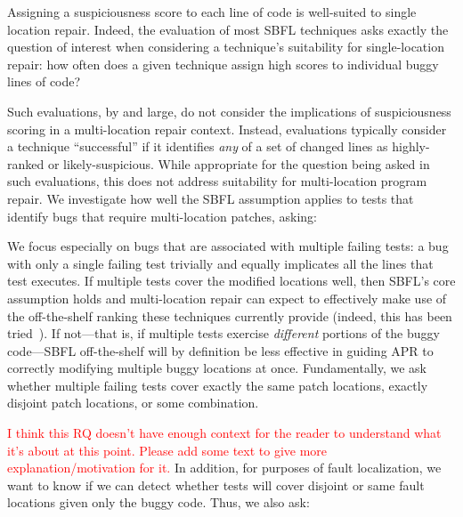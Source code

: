 \documentclass[10pt, conference]{IEEEtran}
\newcommand\todo[1]{\textcolor{red}{#1}}
\begin{document}


Assigning a suspiciousness score to each line of code is well-suited to single
location repair. Indeed, the evaluation of most SBFL techniques asks exactly the
question of interest when considering a technique's suitability for
single-location repair: how often does a given technique assign high scores to 
individual buggy lines of code?

Such evaluations, by and large, do not consider the implications of
suspiciousness scoring in a multi-location repair context.  Instead, evaluations
typically consider a technique ``successful'' if it identifies \emph{any} of a
set of changed lines as highly-ranked or likely-suspicious.  While appropriate
for the question being asked in such evaluations, this does not address
suitability for multi-location program repair.%
We investigate how well the SBFL assumption
applies to tests that identify bugs that require multi-location patches, asking: 


We focus especially on bugs that are associated with multiple failing tests: a bug
with only a single failing test trivially and equally implicates all the lines
that test executes.  If multiple tests cover the modified locations well, then
SBFL's core assumption holds and multi-location repair can expect to effectively
make use of the off-the-shelf ranking these techniques currently provide
(indeed, this has been tried~\cite{angelix}). If not---that is, if multiple
tests exercise \emph{different} portions of the buggy code---SBFL off-the-shelf
will by definition be less effective in guiding APR to correctly modifying
multiple buggy locations at once.
Fundamentally, we ask whether multiple failing tests cover exactly the same
patch locations, exactly disjoint patch locations, or some combination.

\todo{I think this RQ doesn't have enough context for the reader to understand
  what it's about at this point.  Please add some text to give more
  explanation/motivation for it.}
In addition, for purposes of fault localization, we want to know if we can detect 
whether tests will cover disjoint or same fault locations given only the buggy code. 
Thus, we also ask:
\end{document}
